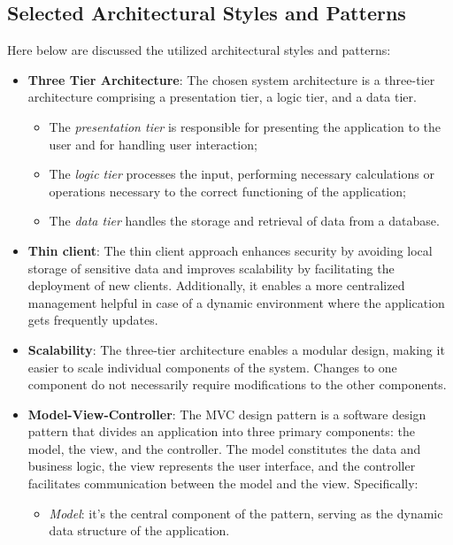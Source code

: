 \documentclass[../DD.tex]{subfiles}
\begin{document}
    \subsection{Selected Architectural Styles and Patterns}\label{subsec:selected_architectural_styles_and_patterns}
    Here below are discussed the utilized architectural styles and patterns:
    \begin{itemize}
        \item {\textbf{Three Tier Architecture}: The chosen system architecture is a three-tier architecture comprising a presentation tier, a logic tier, and a data tier.
        \begin{itemize}
            \item {The \textit{presentation tier} is responsible for presenting the application to the user and for handling user interaction;}
            \item {The \textit{logic tier} processes the input, performing necessary calculations or operations necessary to the correct functioning of the application;}
            \item {The \textit{data tier} handles the storage and retrieval of data from a database.}
        \end{itemize}}
        \item {\textbf{Thin client}: The thin client approach enhances security by avoiding local storage of sensitive data and improves scalability by facilitating the deployment of new clients. 
        Additionally, it enables a more centralized management helpful in case of a dynamic environment where the application gets frequently updates.}
        \item {\textbf{Scalability}: The three-tier architecture enables a modular design, making it easier to scale individual components of the system. 
        Changes to one component do not necessarily require modifications to the other components.}
        \item {\textbf{Model-View-Controller}: The MVC design pattern is a software design pattern that divides an application into three primary components: the model, the view, and the controller. 
        The model constitutes the data and business logic, the view represents the user interface, and the controller facilitates communication between the model and the view. Specifically:
        \begin{itemize}
            \item {\textit{Model}: it's the central component of the pattern, serving as the dynamic data structure of the application. 
}
\end{itemize}}
\end{itemize}
\end{document}
